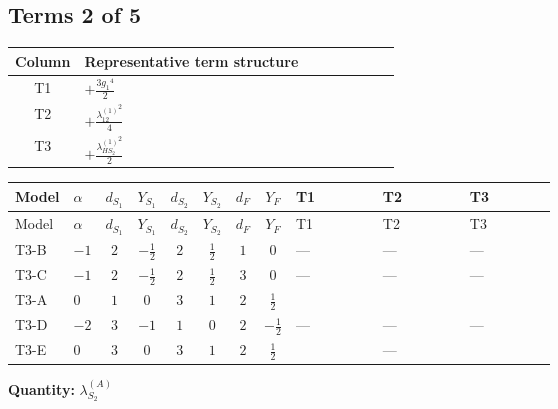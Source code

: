 \documentclass[8pt]{article}
\begin{document}
\begin{landscape}
\subsection*{Terms 2 of 5}
\begin{center}
\begin{tabular}{@{}c >{\raggedright\arraybackslash}p{0.82\linewidth}@{}}
\toprule
Column & Representative term structure \\
\midrule
T1 & \(\displaystyle +\frac{3 {g_1}^4}{2}\) \\
\midrule
T2 & \(\displaystyle +\frac{{\lambda_{12}^{(1)}}^2}{4}\) \\
\midrule
T3 & \(\displaystyle +\frac{{\lambda_{HS_2}^{(1)}}^2}{2}\) \\
\midrule
\bottomrule
\end{tabular}
\end{center}
\smallskip
\tiny
\begin{longtable}{@{}llcccccc >{\raggedright\arraybackslash}p{0.21\linewidth} >{\raggedright\arraybackslash}p{0.21\linewidth} >{\raggedright\arraybackslash}p{0.21\linewidth}@{}}
\toprule
Model & $\alpha$ & $d_{S_1}$ & $Y_{S_1}$ & $d_{S_2}$ & $Y_{S_2}$ & $d_F$ & $Y_F$ & T1 & T2 & T3 \\
\midrule
\endfirsthead
\toprule
Model & $\alpha$ & $d_{S_1}$ & $Y_{S_1}$ & $d_{S_2}$ & $Y_{S_2}$ & $d_F$ & $Y_F$ & T1 & T2 & T3 \\
\midrule
\endhead
T3-B & $-1$ & $2$ & $-\frac{1}{2}$ & $2$ & $\frac{1}{2}$ & $1$ & $0$ & --- & --- & --- \\
\midrule
T3-C & $-1$ & $2$ & $-\frac{1}{2}$ & $2$ & $\frac{1}{2}$ & $3$ & $0$ & --- & --- & --- \\
\midrule
T3-A & $0$ & $1$ & $0$ & $3$ & $1$ & $2$ & $\frac{1}{2}$ & \scriptsize\adjustbox{max width=\linewidth}{$\begin{gathered} +\frac{3 {g_1}^4}{2}\end{gathered}$} & \scriptsize\adjustbox{max width=\linewidth}{$\begin{gathered} +\frac{{\lambda_{12}^{(1)}}^2}{4}\end{gathered}$} & \scriptsize\adjustbox{max width=\linewidth}{$\begin{gathered} +\frac{{\lambda_{HS_2}^{(1)}}^2}{2}\end{gathered}$} \\
\midrule
T3-D & $-2$ & $3$ & $-1$ & $1$ & $0$ & $2$ & $-\frac{1}{2}$ & --- & --- & --- \\
\midrule
T3-E & $0$ & $3$ & $0$ & $3$ & $1$ & $2$ & $\frac{1}{2}$ & \scriptsize\adjustbox{max width=\linewidth}{$\begin{gathered} +\frac{3 {g_1}^4}{2}\end{gathered}$} & --- & \scriptsize\adjustbox{max width=\linewidth}{$\begin{gathered} +\frac{{\lambda_{HS_2}^{(1)}}^2}{2}\end{gathered}$} \\
\midrule
\bottomrule
\end{longtable}
\clearpage
\noindent\textbf{Quantity: }$\lambda_{S_2}^{(A)}$\par\smallskip

\end{landscape}
\end{document}
